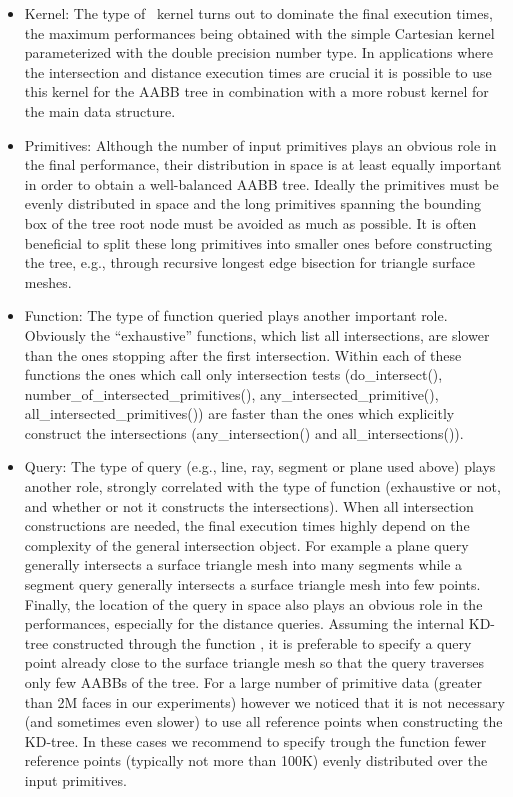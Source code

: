 \begin{itemize}

\item Kernel: The type of \cgal\ kernel turns out to dominate the final execution times, the maximum performances being obtained with the simple Cartesian kernel parameterized with the double precision number type. In applications where the intersection and distance execution times are crucial it is possible to use this kernel for the AABB tree in combination with a more robust kernel for the main data structure.

\item Primitives: Although the number of input primitives plays an obvious role in the final performance, their distribution in space is at least equally important in order to obtain a well-balanced AABB tree. Ideally the primitives must be evenly distributed in space and the long primitives spanning the bounding box of the tree root node must be avoided as much as possible. It is often beneficial to split these long primitives into smaller ones before constructing the tree, e.g., through recursive longest edge bisection for triangle surface meshes.

\item Function: The type of function queried plays another important role. Obviously the ``exhaustive'' functions, which list all intersections, are slower than the ones stopping after the first intersection. Within each of these functions the ones which call only intersection tests (do\_intersect(), number\_of\_intersected\_primitives(), any\_intersected\_primitive(), all\_intersected\_primitives()) are faster than the ones which explicitly construct the intersections (any\_intersection() and all\_intersections()).

\item Query: The type of query (e.g., line, ray, segment or plane used above) plays another role, strongly correlated with the type of function (exhaustive or not, and whether or not it constructs the intersections). When all intersection constructions are needed, the final execution times highly depend on the complexity of the general intersection object. For example a plane query generally intersects a surface triangle mesh into many segments while a segment query generally intersects a surface triangle mesh into few points. Finally, the location of the query in space also plays an obvious role in the performances, especially for the distance queries. Assuming the internal KD-tree constructed through the function , it is preferable to specify a query point already close to the surface triangle mesh so that the query traverses only few AABBs of the tree. For a large number of primitive data (greater than 2M faces in our experiments) however we noticed that it is not necessary (and sometimes even slower) to use all reference points when constructing the KD-tree. In these cases we recommend to specify trough the function  fewer reference points (typically not more than 100K) evenly distributed over the input primitives.

\end{itemize}

